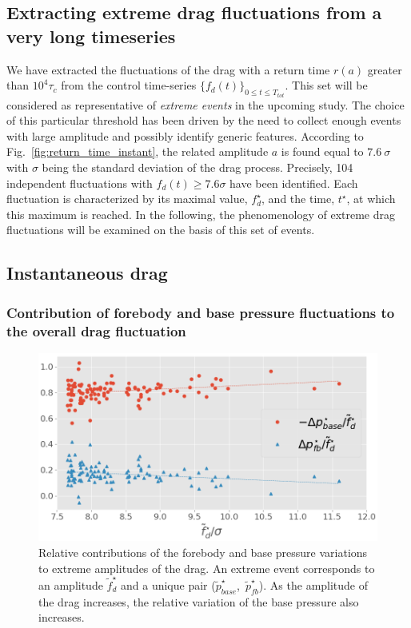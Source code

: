 \documentclass[pre,aps,floatfix,10pt,superscriptaddress, notitlepage,preprint]{revtex4-1}
\newcommand{\TL}[1]{{\color{mygreen}{#1}}}
\begin{document}



\subsection{Extracting extreme drag fluctuations from a very long timeseries}
\label{sec:extreme_extraction}

%
We have extracted the fluctuations of the drag with a return time $r(a)$ greater than  $10^4\tau_c$ from the control time-series $\{f_d(t)\}_{0 \leq t \leq T_{tot}}$.
This set will be considered as representative of \emph{extreme events} in the upcoming study.
The choice of this particular threshold has been driven by the need to collect enough events with large amplitude and possibly identify generic features.
%
According to Fig.~\ref{fig:return_time_instant}, the related amplitude $a$ is found equal to $7.6~\sigma$ with $\sigma$ being the standard deviation of the drag process.
Precisely, 104 independent fluctuations with $f_d(t) \geq 7.6\sigma$ have been identified. Each fluctuation is characterized by its maximal value, $f_d^{\star}$, and the time, $t^{\star}$, at which this maximum is reached.
%
In the following, the phenomenology of extreme drag fluctuations will be examined on the basis of this set of events.

\subsection{Instantaneous drag}
\label{sec:instantaneous_drag}

\subsubsection{Contribution of forebody and base pressure fluctuations to the overall drag fluctuation}
\label{sec:forebody_and_base_contribution}

\begin{figure}
	\centering
	\includegraphics[width=.8\linewidth]{pressure_ratio/pressure_ratio.png}
	\caption{\label{fig:pressure_ratio} Relative contributions of the forebody and base pressure variations to extreme amplitudes of the drag. An extreme event corresponds to an amplitude $\tilde f^{\star}_d$ and a unique pair  ($\tilde{p}^{\star}_{base}$,~$\tilde{p}^{\star}_{fb}$).
	As the amplitude of the drag increases, the relative variation of the base pressure also increases. 
}
\end{figure}
\end{document}
